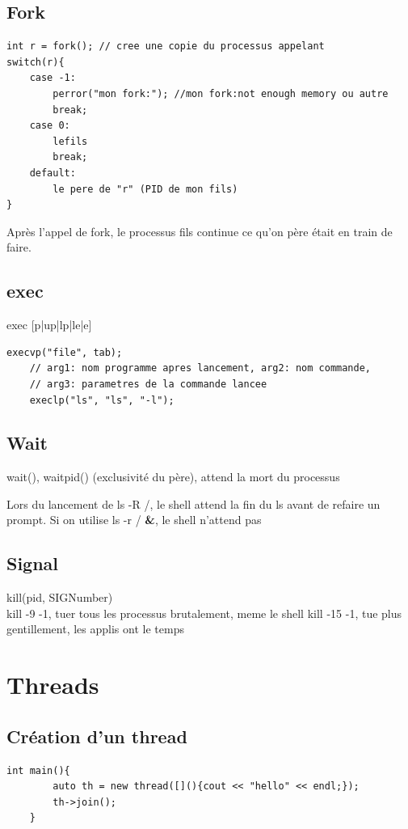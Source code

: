 \documentclass[11pt]{article}
\begin{document}
\subsection{Fork}
\begin{lstlisting}[frame=single]
int r = fork(); // cree une copie du processus appelant  
switch(r){
	case -1:
		perror("mon fork:"); //mon fork:not enough memory ou autre
		break;
	case 0:
		lefils
		break;
	default:
		le pere de "r" (PID de mon fils)
}  
\end{lstlisting}

Après l'appel de fork, le processus fils continue ce qu'on père était en train de faire.

\subsection{exec}
exec [p|up|lp|le|e]
\begin{lstlisting}[frame=single]
	execvp("file", tab);
	// arg1: nom programme apres lancement, arg2: nom commande,
	// arg3: parametres de la commande lancee
	execlp("ls", "ls", "-l"); 
\end{lstlisting}

\subsection{Wait}
wait(), waitpid() (exclusivité du père), attend la mort du processus

Lors du lancement de ls -R /, le shell attend la fin du ls avant de refaire un prompt.
Si on utilise ls -r / \textbf{\&}, le shell n'attend pas

\subsection{Signal}
kill(pid, SIGNumber)\\
kill -9 -1, tuer tous les processus brutalement, meme le shell
kill -15 -1, tue plus gentillement, les applis ont le temps

\pagebreak

\section{Threads}
\subsection{Création d'un thread}

\begin{lstlisting}[frame=single]
	int main(){
		auto th = new thread([](){cout << "hello" << endl;});
		th->join();
	}	
\end{lstlisting}
\end{document}
